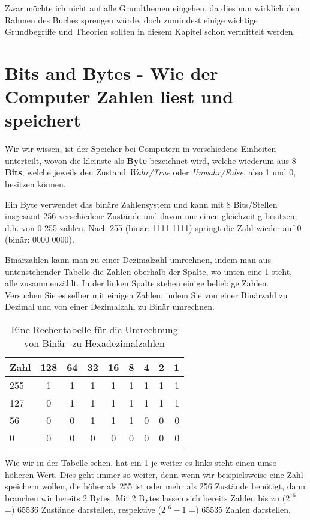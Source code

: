 \documentclass[a4paper,10pt,dvips,fleqn,titlepage,twoside]{book}
\begin{document}
Zwar möchte ich nicht auf alle Grundthemen eingehen, da dies nun wirklich den Rahmen des Buches sprengen würde, doch zumindest einige wichtige Grundbegriffe und Theorien sollten in diesem Kapitel schon vermittelt werden.\newline
\newpage
\section{Bits and Bytes - Wie der Computer Zahlen liest und speichert}
Wir wir wissen, ist der Speicher bei Computern in verschiedene Einheiten unterteilt, wovon die kleinste als \textbf{Byte} bezeichnet wird, welche wiederum aus 8 \textbf{Bits}, welche jeweils den Zustand \emph{Wahr/True} oder \emph{Unwahr/False}, also 1 und 0, besitzen können.

Ein Byte verwendet das binäre Zahlensystem und kann mit 8 Bits/Stellen insgesamt 256 verschiedene Zustände und davon nur einen gleichzeitig  besitzen, d.h. von 0-255 zählen. Nach 255 (binär: 1111 1111) springt die Zahl wieder auf 0 (binär: 0000 0000).

Binärzahlen kann man zu einer Dezimalzahl umrechnen, indem man aus untenstehender Tabelle die Zahlen oberhalb der Spalte, wo unten eine 1 steht, alle zusammenzählt. In der linken Spalte stehen einige beliebige Zahlen. Versuchen Sie es selber mit einigen Zahlen, indem Sie von einer Binärzahl zu Dezimal und von einer Dezimalzahl zu Binär umrechnen.


\begin{table}[h]
\caption{Eine Rechentabelle für die Umrechnung von Binär- zu Hexadezimalzahlen}
\begin{tabular}{|l|c|c|c|c|c|c|c|r|}\hline
Zahl & 128 & 64 & 32 & 16 & 8 & 4 & 2 & 1 \\\hline\hline
255 & 1 & 1 & 1 & 1 & 1 & 1 & 1 & 1\\\hline
127 & 0 & 1 & 1 & 1 & 1 & 1 & 1 & 1\\\hline
56 & 0 & 0 & 1 & 1 & 1 & 0 & 0 & 0\\\hline
0 & 0 & 0 & 0 & 0 & 0 & 0 & 0 & 0\\\hline
\end{tabular}
\end{table}

Wie wir in der Tabelle sehen, hat ein 1 je weiter es links steht einen umso höheren Wert. Dies geht immer so weiter, denn wenn wir beispielsweise eine Zahl speichern wollen, die höher als 255 ist oder mehr als 256 Zustände benötigt, dann brauchen wir bereits 2 Bytes. Mit 2 Bytes lassen sich bereits Zahlen \newline bis zu  ($2^{16}$ =)  65536 Zustände darstellen, respektive ($2^{16}-1$ =) 65535 Zahlen darstellen.
\end{document}
